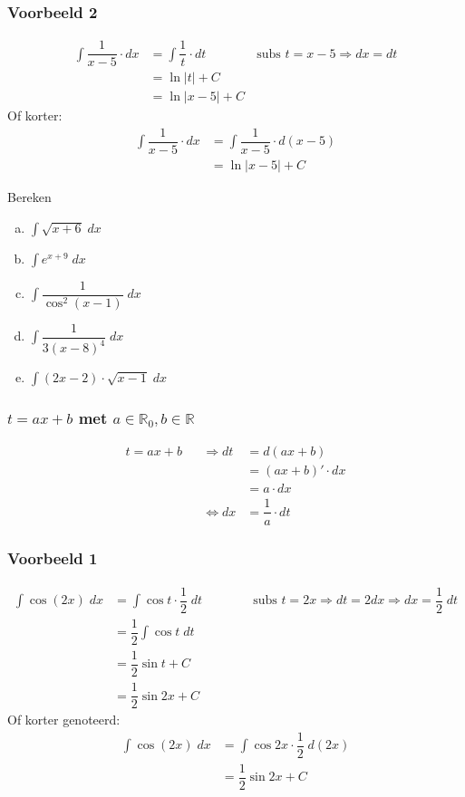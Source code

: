 \documentclass[a4paper,12pt, twoside]{article}
\begin{document}
\subsubsection*{Voorbeeld 2}
\begin{align*}
  \int \dfrac{1}{x-5} \cdot dx &= \int \dfrac{1}{t} \cdot dt \qquad\qquad\mbox{subs }t=x-5 \Rightarrow dx = dt\\
  &= \ln|t| + C\\
  &= \ln|x-5| + C
\end{align*}
Of korter:
\begin{align*}
  \int \dfrac{1}{x-5} \cdot dx &= \int \dfrac{1}{x-5} \cdot d(x-5)\\
  &= \ln|x-5| + C
\end{align*}

\begin{oefening}
  Bereken
  \begin{multicols}{2}
  \begin{enumerate}[(a)]
  \item $\displaystyle\int \sqrt{x+6} \;dx$
  \item $\displaystyle\int e^{x+9} \;dx$
  \item $\displaystyle\int \dfrac{1}{\cos^2(x-1)} \;dx$
  \item $\displaystyle\int \dfrac{1}{3(x-8)^4} \;dx$
  \item $\displaystyle\int (2x-2)\cdot\sqrt{x-1} \;dx$
  \end{enumerate}
\end{multicols}
\end{oefening}

\subsubsection{$t=ax+b$ met $a\in\mathbb{R}_0, b\in\mathbb{R}$}

\begin{alignat*}{2}
  t = ax+b &&\Rightarrow dt &= d(ax+b)\\ && &= (ax+b)'\cdot dx \\ && &= a \cdot dx\\
           &&\Leftrightarrow dx &= \dfrac{1}{a} \cdot dt
\end{alignat*}

\subsubsection*{Voorbeeld 1}
\begin{align*}
  \int \cos(2x) \;dx
  &= \int \cos t \cdot \dfrac{1}{2} \;dt \qquad\qquad\mbox{subs }t=2x \Rightarrow dt = 2dx \Rightarrow dx = \dfrac{1}{2} \;dt\\
  &= \dfrac{1}{2} \int \cos t \;dt\\
  &= \dfrac{1}{2} \sin t + C\\
  &= \dfrac{1}{2} \sin 2x + C
\end{align*}
Of korter genoteerd:
\begin{align*}
  \int \cos(2x) \;dx &= \int \cos 2x \cdot \dfrac{1}{2} \;d(2x)\\
  &= \dfrac{1}{2} \sin 2x + C
\end{align*}
\end{document}
